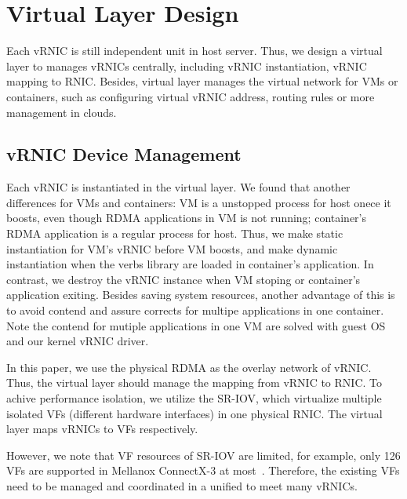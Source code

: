 \section{Virtual Layer Design}
Each vRNIC is still independent unit in host server. Thus, we design a virtual layer to manages vRNICs centrally, including vRNIC instantiation, vRNIC mapping to RNIC. Besides, virtual layer manages the virtual network for VMs or containers, such as configuring virtual vRNIC address, routing rules or more management in clouds.

\subsection{vRNIC Device Management}


Each vRNIC is instantiated in the virtual layer. We found that another differences for VMs and containers: VM is a unstopped process for host onece it boosts, even though RDMA applications in VM is not running; container's RDMA application is a regular process for host. Thus, we make static instantiation for VM's vRNIC before VM boosts, and make dynamic instantiation when the verbs library are loaded in container's application. In contrast, we destroy the vRNIC instance when VM stoping or container's application exiting. Besides saving system resources, another advantage of this is to avoid contend and assure corrects for multipe applications in one container. Note the contend for mutiple applications in one VM are solved with guest OS and our kernel vRNIC driver.

In this paper, we use the physical RDMA as the overlay network of vRNIC. Thus, the virtual layer should manage the mapping from vRNIC to RNIC. To achive performance isolation, we utilize the SR-IOV, which virtualize multiple isolated VFs (different hardware interfaces) in one physical RNIC. The virtual layer maps vRNICs to VFs respectively. 

However, we note that VF resources of SR-IOV are limited, for example, only 126 VFs are supported in Mellanox ConnectX-3 at most~\cite{ofed-manual}. Therefore, the existing VFs need to be managed and coordinated in a unified to meet many vRNICs.

